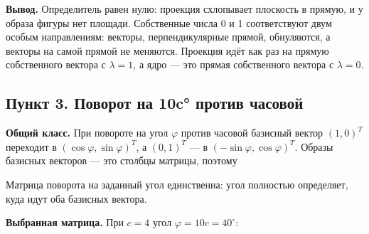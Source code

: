 \documentclass[a4paper,14pt]{extarticle}
\begin{document}
\textbf{Вывод.} Определитель равен нулю: проекция схлопывает плоскость в
прямую, и у образа фигуры нет площади. Собственные числа 0 и 1
соответствуют двум особым направлениям: векторы, перпендикулярные
прямой, обнуляются, а векторы на самой прямой не меняются. Проекция идёт
как раз на прямую собственного вектора с \(\lambda = 1\), а ядро --- это
прямая собственного вектора с \(\lambda = 0\).

\hypertarget{ux43fux443ux43dux43aux442-3.-ux43fux43eux432ux43eux440ux43eux442-ux43dux430-10c-ux43fux440ux43eux442ux438ux432-ux447ux430ux441ux43eux432ux43eux439}{%
\subsection{Пункт 3. Поворот на 10c° против
часовой}\label{ux43fux443ux43dux43aux442-3.-ux43fux43eux432ux43eux440ux43eux442-ux43dux430-10c-ux43fux440ux43eux442ux438ux432-ux447ux430ux441ux43eux432ux43eux439}}

\textbf{Общий класс.} При повороте на угол \(\varphi\) против часовой
базисный вектор \((1, 0)^T\) переходит в
\((\cos\varphi, \sin\varphi)^T\), а \((0, 1)^T\) --- в
\((-\sin\varphi, \cos\varphi)^T\). Образы базисных векторов --- это
столбцы матрицы, поэтому

\begin{center}\end{center}

Матрица поворота на заданный угол единственна: угол полностью
определяет, куда идут оба базисных вектора.

\textbf{Выбранная матрица.} При \(c = 4\) угол
\(\varphi = 10c = 40^\circ\):

\begin{center}\end{center}
\end{document}
